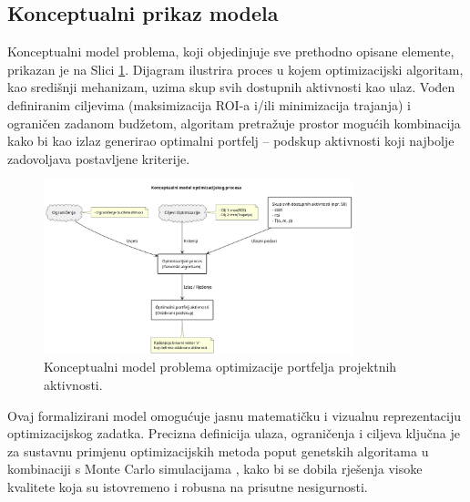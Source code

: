 \subsection{Konceptualni prikaz modela}
Konceptualni model problema, koji objedinjuje sve prethodno opisane elemente, prikazan je na Slici \ref{fig:konceptualni_model}. Dijagram ilustrira proces u kojem optimizacijski algoritam, kao središnji mehanizam, uzima skup svih dostupnih aktivnosti kao ulaz. Vođen definiranim ciljevima (maksimizacija ROI-a i/ili minimizacija trajanja) i ograničen zadanom budžetom, algoritam pretražuje prostor mogućih kombinacija kako bi kao izlaz generirao optimalni portfelj – podskup aktivnosti koji najbolje zadovoljava postavljene kriterije.

\begin{figure}[H]
    \centering
    \includegraphics[width=0.8\textwidth]{slike/model_problema.png}
    \caption{Konceptualni model problema optimizacije portfelja projektnih aktivnosti.}
    \label{fig:konceptualni_model}
\end{figure}

Ovaj formalizirani model omogućuje jasnu matematičku i vizualnu reprezentaciju optimizacijskog zadatka. Precizna definicija ulaza, ograničenja i ciljeva ključna je za sustavnu primjenu optimizacijskih metoda poput genetskih algoritama \cite{Mitchell1998} u kombinaciji s Monte Carlo simulacijama \cite{Rubinstein2016}, kako bi se dobila rješenja visoke kvalitete koja su istovremeno i robusna na prisutne nesigurnosti.
